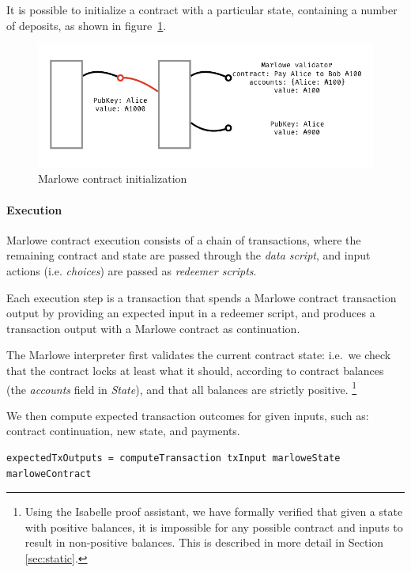 \documentclass[runningheads]{llncs}
\begin{document}
It is possible to initialize a contract with a particular state, containing a number of deposits,
as shown in figure~\ref{fig:marlowe-init}.

\begin{figure}[!h]
\centering
\includegraphics[width=1\textwidth]{figures/Marlowe3-Figures-002.jpeg}
\caption{Marlowe contract initialization}
\label{fig:marlowe-init}
\end{figure}

\paragraph{Execution}

Marlowe contract execution consists of a chain of transactions,
where the remaining contract and state are passed through the \emph{data script},
and input actions (i.e. \emph{choices}) are passed as \emph{redeemer scripts}.

Each execution step is a transaction that spends a Marlowe contract transaction output by providing
an expected input in a redeemer script,
and produces a transaction output with a Marlowe contract as continuation.

The Marlowe interpreter first validates the current contract state: i.e.\
we check that the contract locks at least what it should, according
to contract balances (the \emph{accounts} field in \emph{State}),
and that all balances are strictly positive.
\footnote{
Using the Isabelle proof assistant, we have formally verified that given a state with positive balances,
it is impossible for any possible contract and inputs to result in non-positive balances.
This is described in more detail in Section \ref{sec:static}.}

We then compute expected transaction outcomes for given inputs, such as:
contract continuation, new state, and payments.

\begin{verbatim}
expectedTxOutputs = computeTransaction txInput marloweState marloweContract
\end{verbatim}
\end{document}
